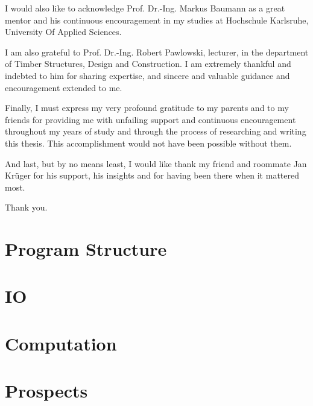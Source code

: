 \documentclass[12pt, oneside]{report}
\begin{document}
I would also like to acknowledge Prof. Dr.-Ing. Markus Baumann as a great mentor and his continuous encouragement in my studies at Hochschule Karlsruhe, University Of Applied Sciences.

I am also grateful to Prof. Dr.-Ing. Robert Pawlowski, lecturer, in the department of Timber Structures, Design and Construction. I am extremely thankful and indebted to him for sharing expertise, and sincere and valuable guidance and encouragement extended to me.

Finally, I must express my very profound gratitude to my parents and to my friends for providing me with unfailing support and continuous encouragement throughout my years of study and through the process of researching and writing this thesis. This accomplishment would not have been possible without them.

And last, but by no means least, I would like thank my friend and roommate Jan Kr\"uger for his support, his insights and for having been there when it mattered most.

Thank you.

\pagestyle{empty}

\tableofcontents

\clearpage
\pagestyle{fancy}

\chapter{Program Structure}


\chapter{IO}


\chapter{Computation}


\chapter{Prospects}




\appendix

\end{document}
